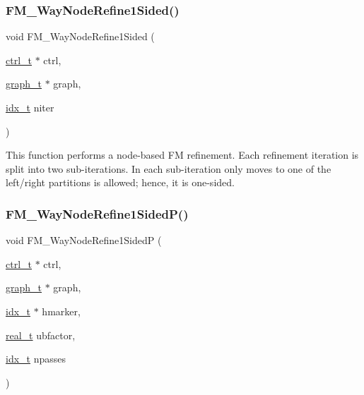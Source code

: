 \subsubsection{\texorpdfstring{F\+M\+\_\+Way\+Node\+Refine1\+Sided()}{FM\_2WayNodeRefine1Sided()}}
{\footnotesize\ttfamily void F\+M\+\_\+Way\+Node\+Refine1\+Sided (\begin{DoxyParamCaption}\item[{\hyperlink{a00742}{ctrl\+\_\+t} $\ast$}]{ctrl,  }\item[{\hyperlink{a00734}{graph\+\_\+t} $\ast$}]{graph,  }\item[{\hyperlink{a00876_aaa5262be3e700770163401acb0150f52}{idx\+\_\+t}}]{niter }\end{DoxyParamCaption})}

This function performs a node-\/based FM refinement. Each refinement iteration is split into two sub-\/iterations. In each sub-\/iteration only moves to one of the left/right partitions is allowed; hence, it is one-\/sided. \mbox{\label{a00945_a1d2b2b5145f4556102f25c25570bb80e}} 
\subsubsection{\texorpdfstring{F\+M\+\_\+Way\+Node\+Refine1\+Sided\+P()}{FM\_2WayNodeRefine1SidedP()}}
{\footnotesize\ttfamily void F\+M\+\_\+Way\+Node\+Refine1\+SidedP (\begin{DoxyParamCaption}\item[{\hyperlink{a00742}{ctrl\+\_\+t} $\ast$}]{ctrl,  }\item[{\hyperlink{a00734}{graph\+\_\+t} $\ast$}]{graph,  }\item[{\hyperlink{a00876_aaa5262be3e700770163401acb0150f52}{idx\+\_\+t} $\ast$}]{hmarker,  }\item[{\hyperlink{a00876_a1924a4f6907cc3833213aba1f07fcbe9}{real\+\_\+t}}]{ubfactor,  }\item[{\hyperlink{a00876_aaa5262be3e700770163401acb0150f52}{idx\+\_\+t}}]{npasses }\end{DoxyParamCaption})}

